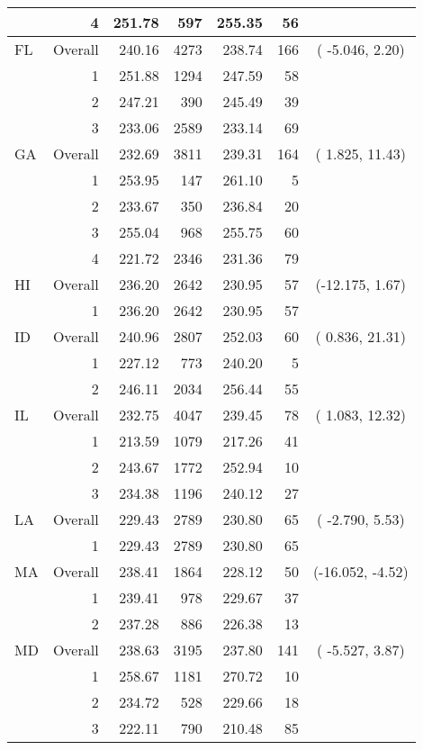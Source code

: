 \begin{longtable}{lrrr@{\extracolsep{.25cm}}rrc}
   & 4 & 251.78 & 597 & 255.35 &  56 &  \\ 
   \hline
FL & Overall & 240.16 & 4273 & 238.74 & 166 & ( -5.046,  2.20) \\ 
   & 1 & 251.88 & 1294 & 247.59 &  58 &  \\ 
   & 2 & 247.21 & 390 & 245.49 &  39 &  \\ 
   & 3 & 233.06 & 2589 & 233.14 &  69 &  \\ 
   \hline
GA & Overall & 232.69 & 3811 & 239.31 & 164 & (  1.825, 11.43) \\ 
   & 1 & 253.95 & 147 & 261.10 &   5 &  \\ 
   & 2 & 233.67 & 350 & 236.84 &  20 &  \\ 
   & 3 & 255.04 & 968 & 255.75 &  60 &  \\ 
   & 4 & 221.72 & 2346 & 231.36 &  79 &  \\ 
   \hline
HI & Overall & 236.20 & 2642 & 230.95 &  57 & (-12.175,  1.67) \\ 
   & 1 & 236.20 & 2642 & 230.95 &  57 &  \\ 
   \hline
ID & Overall & 240.96 & 2807 & 252.03 &  60 & (  0.836, 21.31) \\ 
   & 1 & 227.12 & 773 & 240.20 &   5 &  \\ 
   & 2 & 246.11 & 2034 & 256.44 &  55 &  \\ 
   \hline
IL & Overall & 232.75 & 4047 & 239.45 &  78 & (  1.083, 12.32) \\ 
   & 1 & 213.59 & 1079 & 217.26 &  41 &  \\ 
   & 2 & 243.67 & 1772 & 252.94 &  10 &  \\ 
   & 3 & 234.38 & 1196 & 240.12 &  27 &  \\ 
   \hline
LA & Overall & 229.43 & 2789 & 230.80 &  65 & ( -2.790,  5.53) \\ 
   & 1 & 229.43 & 2789 & 230.80 &  65 &  \\ 
   \hline
MA & Overall & 238.41 & 1864 & 228.12 &  50 & (-16.052, -4.52) \\ 
   & 1 & 239.41 & 978 & 229.67 &  37 &  \\ 
   & 2 & 237.28 & 886 & 226.38 &  13 &  \\ 
   \hline
MD & Overall & 238.63 & 3195 & 237.80 & 141 & ( -5.527,  3.87) \\ 
   & 1 & 258.67 & 1181 & 270.72 &  10 &  \\ 
   & 2 & 234.72 & 528 & 229.66 &  18 &  \\ 
   & 3 & 222.11 & 790 & 210.48 &  85 &  \\ 

\end{longtable}
